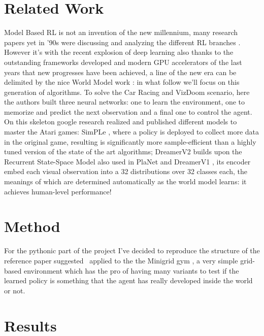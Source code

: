 \documentclass{article}
\begin{document}
\section{Related Work}
Model Based RL is not an invention of the new millennium, many 
research papers yet in '90s were discussing and analyzing the different RL branches \cite{Atkeson97acomparison}.
 However it's with the recent explosion of deep learning  also thanks to the 
 outstanding frameworks developed and modern GPU accelerators of the last years 
 that new progresses have been achieved, a line of the new era can be delimited by the nice World Model work 
 \cite{wm}: in what follow we'll focus on this generation of algorithms. 
 To solve the Car Racing and VizDoom scenario, here the authors built three neural networks: one to learn the environment, one to memorize and predict the next observation and a final one to control the agent. 
 On this skeleton google research realized and published different models to master the Atari games: SimPLe \cite{simple}, where
 a policy is deployed to collect more data in the original game, resulting is significantly more sample-efficient than a highly
 tuned version of the state of the art algorithms; DreamerV2 \cite{dreamerv2} builds upon the Recurrent State-Space Model also used in PlaNet \cite{planet} and DreamerV1 \cite{dreamerv1}, its encoder embed each visual observation into a 32 distributions over 32 classes each, the meanings of which are determined automatically as the world model learns: it achieves human-level performance! 
\section{Method}
For the pythonic part of the project I've decided to reproduce the structure of the reference paper suggested~\cite{wm} applied to the 
the Minigrid gym \cite{gym_minigrid}, a very simple grid-based environment which has the pro of having many variants to test if the learned policy is something that
the agent has really developed inside the world or not.
\section{Results}
\end{document}
